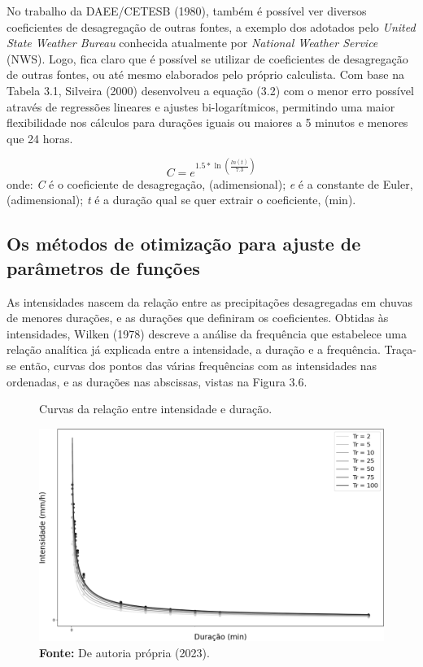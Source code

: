 \newpage

No trabalho da DAEE/CETESB (1980), também é possível ver diversos coeficientes de desagregação de outras fontes, a exemplo dos adotados pelo \textit{United State Weather Bureau} conhecida atualmente por \textit{National Weather Service} (NWS). Logo, fica claro que é possível se utilizar de coeficientes de desagregação de outras fontes, ou até mesmo elaborados pelo próprio calculista. Com base na Tabela 3.1, Silveira (2000) desenvolveu a equação (3.2) com o menor erro possível através de regressões lineares e ajustes bi-logarítmicos, permitindo uma maior flexibilidade nos cálculos para durações iguais ou maiores a 5 minutos e menores que 24 horas.\bigskip

\begin{equation}
C = e^{1.5 * \ln{\left(\frac{ln{\left(t\right)}}{7.3}\right)}}
\end{equation}
\newline
onde:
\newline
\textit{C} é o coeficiente de desagregação, (adimensional);
\newline
\textit{e} é a constante de Euler, (adimensional);
\newline
\textit{t} é a duração qual se quer extrair o coeficiente, (min).\bigskip

\subsection{Os métodos de otimização para ajuste de parâmetros de funções}

As intensidades nascem da relação entre as precipitações desagregadas em chuvas de menores durações, e as durações que definiram os coeficientes. Obtidas às intensidades, Wilken (1978) descreve a análise da frequência que estabelece uma relação analítica já explicada entre a intensidade, a duração e a frequência. Traça-se então, curvas dos pontos das várias frequências com as intensidades nas ordenadas, e as durações nas abscissas, vistas na Figura 3.6.\bigskip

\begin{figure}[!ht]
	\centering
	\caption{Curvas da relação entre intensidade e duração.}
	\includegraphics[width=.7325\linewidth]{figuras/curvas_idf_de_intensidade_e_duracao.png}
	\caption*{\textbf{Fonte:} De autoria própria (2023).}
	\label{fig:curvas_idf_de_intensidade_e_duracao.png}
\end{figure}

